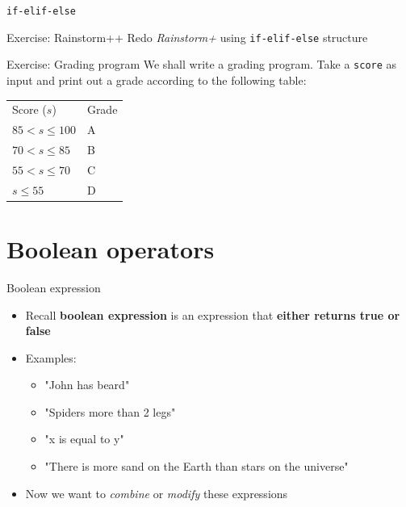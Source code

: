 \documentclass[10pt,xcolor={table,dvipsnames},t]{beamer}
\begin{document}
\begin{frame}[fragile]{\texttt{if-elif-else}}
  \begin{exampleblock}{Exercise: Rainstorm++}
    Redo \textit{Rainstorm+} using \texttt{if-elif-else} structure
  \end{exampleblock}
  \begin{exampleblock}{Exercise: Grading program}
    We shall write a grading program. Take a \texttt{score} as input and print out a grade according to the following table:
    \begin{table}[]
      \begin{tabular}{ll}
      Score ($s$)      & Grade \\
      $85< s \leq 100$ & A     \\
      $70< s \leq 85$  & B     \\
      $55< s \leq 70$  & C     \\
      $ s \leq 55$     & D    
      \end{tabular}
      \end{table}
  \end{exampleblock}
\end{frame}

\section{Boolean operators}
\begin{frame}{Boolean expression}
  \begin{itemize}
    \item Recall \textbf{boolean expression} is an expression that \textbf{either returns true or false}
    \item Examples:
    \begin{itemize}
      \item "John has beard"
      \item "Spiders more than 2 legs"
      \item "x is equal to y"
      \item "There is more sand on the Earth than stars on the universe"
    \end{itemize}
    \item Now we want to \textit{combine} or \textit{modify} these expressions
  \end{itemize}
\end{frame}
\end{document}
